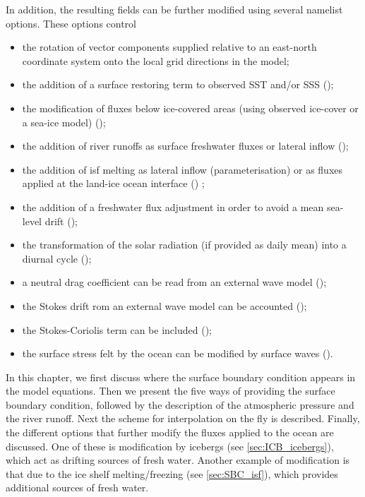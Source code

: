 \documentclass[../main/NEMO_manual]{subfiles}
\begin{document}
In addition, the resulting fields can be further modified using several namelist options.
These options control 
\begin{itemize}
\item
  the rotation of vector components supplied relative to an east-north coordinate system onto
  the local grid directions in the model;
\item
  the addition of a surface restoring term to observed SST and/or SSS ();
\item
  the modification of fluxes below ice-covered areas (using observed ice-cover or a sea-ice model)
  ();
\item
  the addition of river runoffs as surface freshwater fluxes or lateral inflow ();
\item
  the addition of isf melting as lateral inflow (parameterisation) or
  as fluxes applied at the land-ice ocean interface () ; 
\item
  the addition of a freshwater flux adjustment in order to avoid a mean sea-level drift
  ();
\item
  the transformation of the solar radiation (if provided as daily mean) into a diurnal cycle
  ();
\item
  a neutral drag coefficient can be read from an external wave model ();
\item
  the Stokes drift rom an external wave model can be accounted (); 
\item
  the Stokes-Coriolis term can be included ();
\item
  the surface stress felt by the ocean can be modified by surface waves ().
\end{itemize}

In this chapter, we first discuss where the surface boundary condition appears in the model equations.
Then we present the five ways of providing the surface boundary condition, 
followed by the description of the atmospheric pressure and the river runoff. 
Next the scheme for interpolation on the fly is described.
Finally, the different options that further modify the fluxes applied to the ocean are discussed.
One of these is modification by icebergs (see \autoref{sec:ICB_icebergs}),
which act as drifting sources of fresh water.
Another example of modification is that due to the ice shelf melting/freezing (see \autoref{sec:SBC_isf}), 
which provides additional sources of fresh water.
\end{document}
